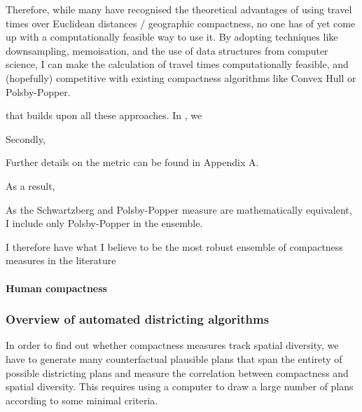 \documentclass[]{article}
\let\oldparagraph\paragraph
\renewcommand{\paragraph}[1]{\oldparagraph{#1}\mbox{}}
\begin{document}
Therefore, while many have recognised the theoretical advantages of
using travel times over Euclidean distances / geographic compactness, no
one has of yet come up with a computationally feasible way to use it. By
adopting techniques like downsampling, memoisation, and the use of data
structures from computer science, I can make the calculation of travel
times computationally feasible, and (hopefully) competitive with
existing compactness algorithms like Convex Hull or Polsby-Popper.

that builds upon all these approaches. In \cite{elrwp}, we

Secondly,

Further details on the metric can be found in Appendix A.

As a result,

As the Schwartzberg and Polsby-Popper measure are mathematically
equivalent, I include only Polsby-Popper in the ensemble.

I therefore have what I believe to be the most robust ensemble of
compactness measures in the literature

\hypertarget{human-compactness}{%
\paragraph{Human compactness}\label{human-compactness}}

\hypertarget{overview-of-automated-districting-algorithms}{%
\subsubsection{Overview of automated districting
algorithms}\label{overview-of-automated-districting-algorithms}}

In order to find out whether compactness measures track spatial
diversity, we have to generate many counterfactual plausible plans that
span the entirety of possible districting plans and measure the
correlation between compactness and spatial diversity. This requires
using a computer to draw a large number of plans according to some
minimal criteria.
\end{document}
